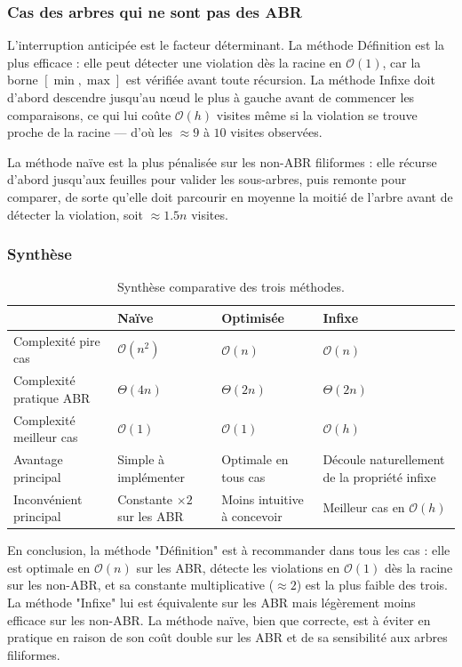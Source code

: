 \documentclass[12pt, a4paper]{article}
\begin{document}
\subsubsection{Cas des arbres qui ne sont pas des ABR}

L'interruption anticipée est le facteur déterminant. La méthode Définition est la
plus efficace : elle peut détecter une violation dès la racine en $\mathcal{O}(1)$,
car la borne $[\min, \max]$ est vérifiée avant toute récursion. La méthode Infixe
doit d'abord descendre jusqu'au nœud le plus à gauche avant de commencer les
comparaisons, ce qui lui coûte $\mathcal{O}(h)$ visites même si la violation se
trouve proche de la racine — d'où les $\approx 9$ à $10$ visites observées.

La méthode naïve est la plus pénalisée sur les non-ABR filiformes : elle récurse
d'abord jusqu'aux feuilles pour valider les sous-arbres, puis remonte pour comparer,
de sorte qu'elle doit parcourir en moyenne la moitié de l'arbre avant de détecter
la violation, soit $\approx 1.5n$ visites.

\subsubsection{Synthèse}

\begin{table}[H]
	\centering
	\setlength{\tabcolsep}{5pt}
	\begin{tabular}{l p{3.2cm} p{3.2cm} p{3.2cm}}
		\toprule
		& \textbf{Naïve} & \textbf{Optimisée} & \textbf{Infixe} \\
		\midrule
		Complexité pire cas
		& $\mathcal{O}(n^2)$
		& $\mathcal{O}(n)$
		& $\mathcal{O}(n)$ \\
		Complexité pratique ABR
		& $\Theta(4n)$
		& $\Theta(2n)$
		& $\Theta(2n)$ \\
		Complexité meilleur cas
		& $\mathcal{O}(1)$
		& $\mathcal{O}(1)$
		& $\mathcal{O}(h)$ \\
		Avantage principal
		& Simple à implémenter
		& Optimale en tous cas
		& Découle naturellement de la propriété infixe \\
		Inconvénient principal
		& Constante $\times 2$ sur les ABR
		& Moins intuitive à concevoir
		& Meilleur cas en $\mathcal{O}(h)$ \\
		\bottomrule
	\end{tabular}
	\caption{Synthèse comparative des trois méthodes.}
	\label{tab:synthese}
\end{table}

En conclusion, la méthode "Définition" est à recommander dans tous les cas : elle
est optimale en $\mathcal{O}(n)$ sur les ABR, détecte les violations en $\mathcal{O}(1)$
dès la racine sur les non-ABR, et sa constante multiplicative ($\approx 2$) est
la plus faible des trois. La méthode "Infixe" lui est équivalente sur les ABR mais
légèrement moins efficace sur les non-ABR. La méthode naïve, bien que correcte,
est à éviter en pratique en raison de son coût double sur les ABR et de sa
sensibilité aux arbres filiformes.
\end{document}
